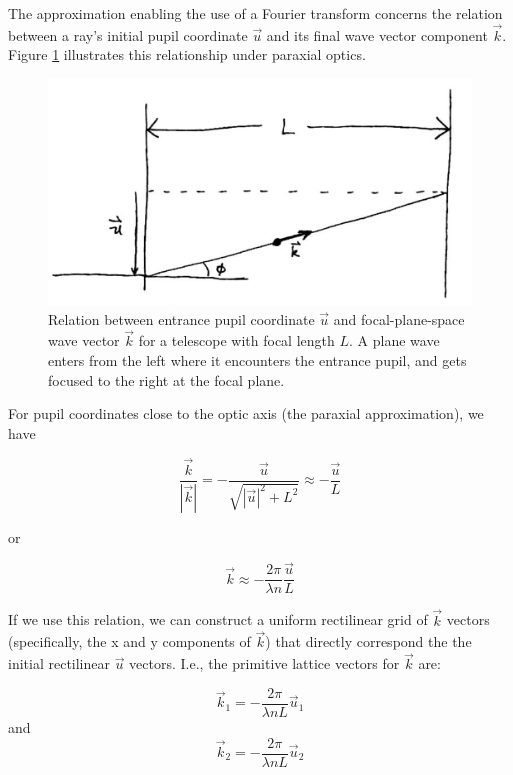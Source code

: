 \documentclass{article}
\begin{document}
The approximation enabling the use of a Fourier transform concerns the relation between a ray's
initial pupil coordinate $\vec{u}$ and its final wave vector component $\vec{k}$.  Figure
\ref{fig:wavevector} illustrates this relationship under paraxial optics.

\begin{figure}
    \includegraphics{wavevector.png}

    \caption{Relation between entrance pupil coordinate $\vec{u}$ and focal-plane-space wave vector
    $\vec{k}$ for a telescope with focal length $L$.  A plane wave enters from the left where it
    encounters the entrance pupil, and gets focused to the right at the focal plane.}

    \label{fig:wavevector}
\end{figure}

For pupil coordinates close to the optic axis (the paraxial approximation), we have

\begin{equation}
    \frac{\vec{k}}{|\vec{k}|} = -\frac{\vec{u}}{\sqrt{|\vec{u}|^2 + L^2}} \approx -\frac{\vec{u}}{L}
\end{equation}

or

\begin{equation}
    \vec{k} \approx -\frac{2 \pi}{\lambda n}\frac{\vec{u}}{L}
    \label{eqn:kuapprox}
\end{equation}

If we use this relation, we can construct a uniform rectilinear grid of $\vec{k}$ vectors
(specifically, the x and y components of $\vec{k}$) that directly correspond the the initial
rectilinear $\vec{u}$ vectors.  I.e., the primitive lattice vectors for $\vec{k}$ are:

\begin{equation}
    \vec{k}_1 = -\frac{2 \pi}{\lambda n L} \vec{u}_1
\end{equation}
and
\begin{equation}
    \vec{k}_2 = -\frac{2 \pi}{\lambda n L} \vec{u}_2
\end{equation}
\end{document}
